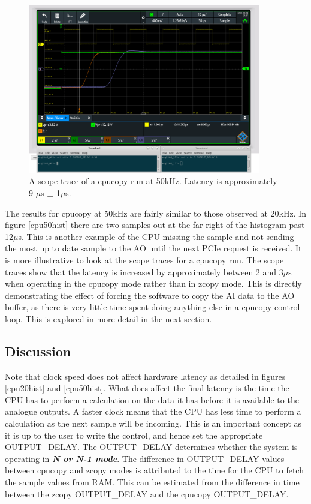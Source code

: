\documentclass{article}
\begin{document}
\begin{figure} [htb!]
	\centering
	\includegraphics[width=4.0in]{images/50kHz_annotated_scope_cpucopy_2.png}
	\caption{A scope trace of a cpucopy run at 50kHz. Latency is approximately  9 $\mu$s $\pm$ 1$\mu$s.}
	\label{cpu50scope}
\end{figure}

The results for cpucopy at 50kHz are fairly similar to those observed at 20kHz.
In figure \ref{cpu50hist} there are two samples out at the far right of the histogram past 12$\mu$s.
This is another example of the CPU missing the sample and not sending the most up to date sample to the AO until the next PCIe request is received.
It is more illustrative to look at the scope traces for a cpucopy run.
The scope traces show that the latency is increased by approximately between 2 and 3$\mu$s when operating in the cpucopy mode rather than in zcopy mode.
This is directly demonstrating the effect of forcing the software to copy the AI data to the AO buffer, as there is very little time spent doing anything else in a cpucopy control loop.
This is explored in more detail in the next section.

\newpage
\subsection{Discussion}
Note that clock speed does not affect hardware latency as detailed in figures \ref{cpu20hist} and \ref{cpu50hist}.
What does affect the final latency is the time the CPU has to perform a calculation on the data it has before it is available to the analogue outputs.
A faster clock means that the CPU has less time to perform a calculation as the next sample will be incoming.
This is an important concept as it is up to the user to write the control, and hence set the appropriate OUTPUT\_DELAY.
The OUTPUT\_DELAY determines whether the system is operating in \textit{\textbf{N or N-1 mode}}.
The difference in OUTPUT\_DELAY values between cpucopy and zcopy modes is attributed to the time for the CPU to fetch the sample values from RAM.
This can be estimated from the difference in time between the zcopy OUTPUT\_DELAY and the cpucopy OUTPUT\_DELAY.
\end{document}
